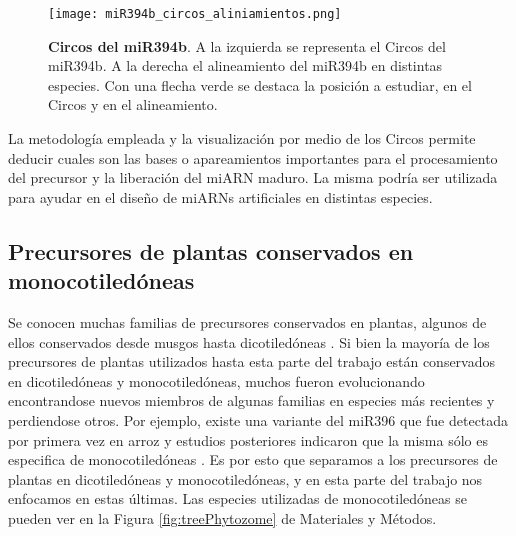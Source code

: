 \begin{figure}[htbp!] 
	\centering    
	\texttt{[image: miR394b\_circos\_aliniamientos.png]}
	\caption[Circos del miR394b]{
		\textbf{Circos del miR394b}.
		A la izquierda se representa el Circos del miR394b.
		A la derecha el alineamiento del miR394b en distintas especies. 
		Con una flecha verde se destaca la posición a estudiar, en el Circos y en el alineamiento.
	}
	\label{fig:miR394b_circos_aliniamientos}
\end{figure}

La metodología empleada y la visualización por medio de los Circos permite deducir cuales son las bases o apareamientos importantes para el procesamiento del precursor y la liberación del miARN maduro.
La misma podría ser utilizada para ayudar en el diseño de miARNs artificiales en distintas especies.


\subsection{Precursores de plantas conservados en monocotiledóneas}

Se conocen muchas familias de precursores conservados en plantas, algunos de ellos conservados desde musgos hasta dicotiledóneas \citep{pmid15849273,Axtell2008343,citeulike:8816489}.
Si bien la mayoría de los precursores de plantas utilizados hasta esta parte del trabajo están conservados en dicotiledóneas y monocotiledóneas, muchos fueron evolucionando encontrandose nuevos miembros de algunas familias en especies más recientes y perdiendose otros.    
Por ejemplo, existe una variante del miR396 que fue detectada por primera vez en arroz \citep{pmid15805478} y estudios posteriores indicaron que la misma sólo es especifica de monocotiledóneas \citep{pmid18416839, pmid19936050}.
Es por esto que separamos a los precursores de plantas en dicotiledóneas y monocotiledóneas, y en esta parte del trabajo nos enfocamos en estas últimas.
Las especies utilizadas de monocotiledóneas se pueden ver en la Figura \ref{fig:treePhytozome} de Materiales y Métodos.

